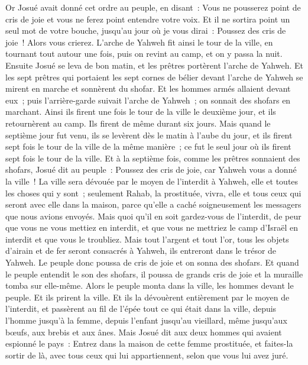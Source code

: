 \begin{multicols}{2}
Or Josué avait donné cet ordre au peuple, en disant~: Vous ne pousserez point de cris de joie et vous ne ferez point entendre votre voix. Et il ne sortira point un seul mot de votre bouche, jusqu'au jour où je vous dirai~: Poussez des cris de joie~! Alors vous crierez.
L'arche de Yahweh fit ainsi le tour de la ville, en tournant tout autour une fois, puis on revint au camp, et on y passa la nuit.
Ensuite Josué se leva de bon matin, et les prêtres portèrent l'arche de Yahweh.
Et les sept prêtres qui portaient les sept cornes de bélier devant l'arche de Yahweh se mirent en marche et sonnèrent du shofar. Et les hommes armés allaient devant eux~; puis l'arrière-garde suivait l'arche de Yahweh~; on sonnait des shofars en marchant.
Ainsi ils firent une fois le tour de la ville le deuxième jour, et ils retournèrent au camp. Ils firent de même durant six jours.
Mais quand le septième jour fut venu, ils se levèrent dès le matin à l'aube du jour, et ils firent sept fois le tour de la ville de la même manière~; ce fut le seul jour où ils firent sept fois le tour de la ville.
Et à la septième fois, comme les prêtres sonnaient des shofars, Josué dit au peuple~: Poussez des cris de joie, car Yahweh vous a donné la ville~!
La ville sera dévouée par le moyen de l'interdit à Yahweh, elle et toutes les choses qui y sont~; seulement Rahab, la prostituée, vivra, elle et tous ceux qui seront avec elle dans la maison, parce qu'elle a caché soigneusement les messagers que nous avions envoyés.
Mais quoi qu'il en soit gardez-vous de l'interdit, de peur que vous ne vous mettiez en interdit, et que vous ne mettriez le camp d'Israël en interdit et que vous le troubliez.
Mais tout l'argent et tout l'or, tous les objets d'airain et de fer seront consacrés à Yahweh, ils entreront dans le trésor de Yahweh.
Le peuple donc poussa de cris de joie et on sonna des shofars. Et quand le peuple entendit le son des shofars, il poussa de grands cris de joie et la muraille tomba sur elle-même. Alors le peuple monta dans la ville, les hommes devant le peuple. Et ils prirent la ville. 
Et ils la dévouèrent entièrement par le moyen de l'interdit, et passèrent au fil de l'épée tout ce qui était dans la ville, depuis l'homme jusqu'à la femme, depuis l'enfant jusqu'au vieillard, même jusqu'aux bœufs, aux brebis et aux ânes.
Mais Josué dit aux deux hommes qui avaient espionné le pays~: Entrez dans la maison de cette femme prostituée, et faites-la sortir de là, avec tous ceux qui lui appartiennent, selon que vous lui avez juré.

\end{multicols}
